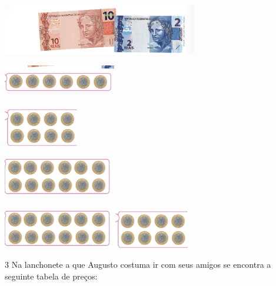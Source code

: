 
\includegraphics[width=3.34196in,height=0.88341in]{./media/image82.png}

\begin{escolha}
\item
\includegraphics[width=1.93350in,height=0.50004in]{./media/image83.png}

\item
\includegraphics[width=1.26678in,height=0.72506in]{./media/image84.png}

\item
\includegraphics[width=1.95850in,height=0.69173in]{./media/image85.png}

\item
\includegraphics[width=1.95850in,height=0.69173in]{./media/image85.png}\includegraphics[width=1.26678in,height=0.72506in]{./media/image84.png}
\end{escolha}



\num{3} Na lanchonete a que Augusto costuma ir com seus amigos se encontra a
seguinte tabela de preços:

